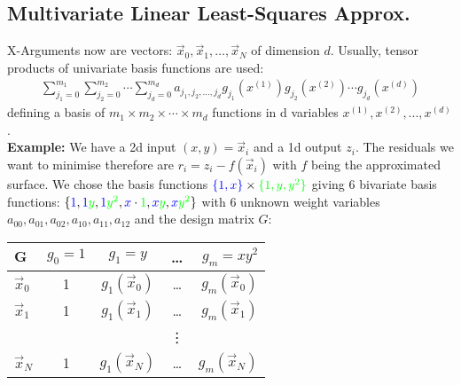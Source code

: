 \subsection{Multivariate Linear Least-Squares Approx.}

X-Arguments now are vectors:
$\vec{x}_0, \vec{x}_1, \ldots, \vec{x}_N$ of dimension $d$.
Usually, tensor products of univariate basis functions are used:
\begin{align*}
    \sum_{j_1=0}^{m_1} \sum_{j_2=0}^{m_2}\cdots \sum_{j_d=0}^{m_d}
    a_{j_1, j_2, \ldots, j_d}g_{j_1}(x^{(1)})g_{j_2}(x^{(2)})\cdots g_{j_d}(x^{(d)})
\end{align*}
defining a basis of $m_1\times m_2\times \cdots \times m_d$ functions in d variables $x^{(1)}, x^{(2)},...,x^{(d)}$.
\\[1em]
\textbf{Example:}
We have a 2d input $(x,y)=\vec{x}_i$ and a 1d output $z_i$.
The residuals we want to minimise therefore are $r_i=z_i-f(\vec{x}_i)$ with $f$ being the approximated surface.
We chose the basis functions ${\color{blue}\{1, x\}}\times{\color{green}\{1, y, y^2\}}$ giving 6 bivariate basis functions:
$\{{\color{blue}1}, {\color{blue}1}{\color{green}y}, {\color{blue}1}{\color{green}y^2},
    {\color{blue}x}\cdot{\color{green}1}, {\color{blue}x}{\color{green}y}, {\color{blue}x}{\color{green}y^2}
\}$ with 6 unknown weight variables $a_{00}, a_{01}, a_{02}, a_{10}, a_{11}, a_{12}$ and the design matrix $G$:

\begin{center}
    \begin{tabular}{l|cccr}
        $\mathbf{G}$ & $g_0 = 1$ & $g_1 = y$        & \ldots & $g_m=xy^2$       \\
        \hline
        $\vec{x}_0$  & 1         & $g_1(\vec{x}_0)$ & \ldots & $g_m(\vec{x}_0)$ \\
        $\vec{x}_1$  & 1         & $g_1(\vec{x}_1)$ & \ldots & $g_m(\vec{x}_1)$ \\
                     &           &                  & \vdots &                  \\
        $\vec{x}_N$  & 1         & $g_1(\vec{x}_N)$ & \ldots & $g_m(\vec{x}_N)$ \\
    \end{tabular}
\end{center}









